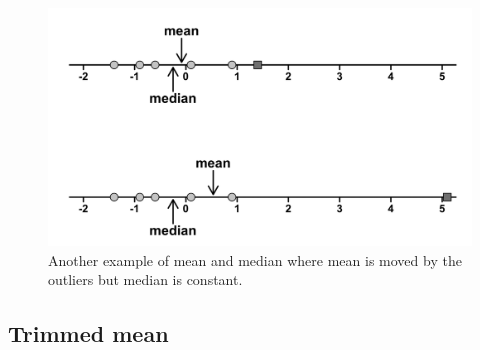 \documentclass[
]{book}
\begin{document}
\begin{figure}
\centering
\includegraphics{./img/descriptives2/mean_median.png}
\caption{\label{fig:meanmedian2}Another example of mean and median where mean is moved by the outliers but median is constant.}
\end{figure}

\hypertarget{trimmedmean}{%
\subsection{Trimmed mean}\label{trimmedmean}}
\end{document}
